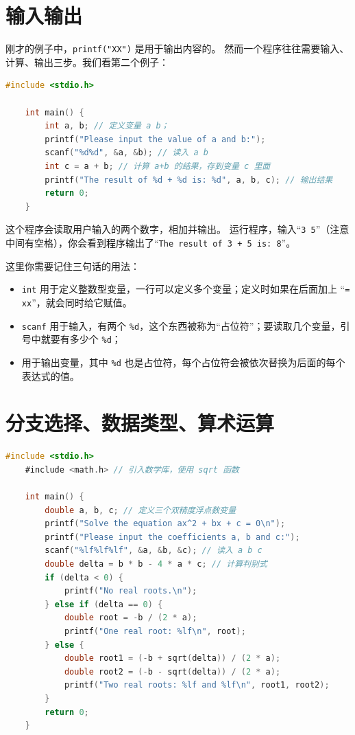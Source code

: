 \documentclass[lang=cn,newtx,10pt,scheme=chinese]{elegantbook}
\begin{document}
\section{输入输出}

刚才的例子中，\lstinline{printf("XX")} 是用于输出内容的。
然而一个程序往往需要输入、计算、输出三步。我们看第二个例子：

\label{sec:input-output}
\begin{lstlisting}[language=C]
    #include <stdio.h>
    
    int main() {
        int a, b; // 定义变量 a b；
        printf("Please input the value of a and b:");
        scanf("%d%d", &a, &b); // 读入 a b
        int c = a + b; // 计算 a+b 的结果，存到变量 c 里面
        printf("The result of %d + %d is: %d", a, b, c); // 输出结果
        return 0;
    }
\end{lstlisting}

这个程序会读取用户输入的两个数字，相加并输出。
运行程序，输入“\lstinline{3 5}”（注意中间有空格），你会看到程序输出了“\lstinline{The result of 3 + 5 is: 8}”。

这里你需要记住三句话的用法：

\begin{itemize}
    \item \lstinline{int} 用于定义整数型变量，一行可以定义多个变量；定义时如果在后面加上 “\lstinline{= xx}”，就会同时给它赋值。
    \item \lstinline{scanf} 用于输入，有两个 \lstinline{%d}，这个东西被称为“占位符”；要读取几个变量，引号中就要有多少个 \lstinline{%d}；
    \item {} 用于输出变量，其中 \lstinline{%d} 也是占位符，每个占位符会被依次替换为后面的每个表达式的值。
\end{itemize}

\section{分支选择、数据类型、算术运算}

\begin{lstlisting}[language=C]
    #include <stdio.h>
    #include <math.h> // 引入数学库，使用 sqrt 函数

    int main() {
        double a, b, c; // 定义三个双精度浮点数变量
        printf("Solve the equation ax^2 + bx + c = 0\n");
        printf("Please input the coefficients a, b and c:");
        scanf("%lf%lf%lf", &a, &b, &c); // 读入 a b c
        double delta = b * b - 4 * a * c; // 计算判别式
        if (delta < 0) {
            printf("No real roots.\n");
        } else if (delta == 0) {
            double root = -b / (2 * a);
            printf("One real root: %lf\n", root);
        } else {
            double root1 = (-b + sqrt(delta)) / (2 * a);
            double root2 = (-b - sqrt(delta)) / (2 * a);
            printf("Two real roots: %lf and %lf\n", root1, root2);
        }
        return 0;
    }
\end{lstlisting}
\end{document}
